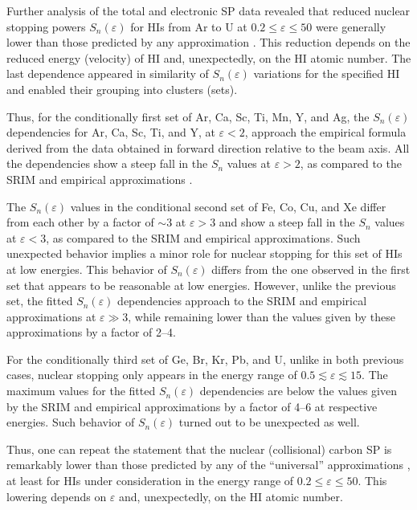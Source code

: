 \documentclass[aps,pra,twocolumn,amsmath,amssymb,floatfix]{revtex4-2}
\begin{document}
Further analysis of the total and electronic SP data revealed that reduced nuclear stopping powers $S_{n}(\varepsilon)$ for HIs from Ar to U at $0.2 \leqslant \varepsilon \leqslant 50$ were generally lower than those predicted by any approximation \cite{SRIM,Garnir80,LSS63,Ziegler77,Wilson77,LNS68}. This reduction depends on the reduced energy (velocity) of HI and, unexpectedly, on the HI atomic number. The last dependence appeared in similarity of $S_{n}(\varepsilon)$ variations for the specified HI and enabled their grouping into clusters (sets).

Thus, for the conditionally first set of Ar, Ca, Sc, Ti, Mn, Y, and Ag, the $S_{n}(\varepsilon)$ dependencies for Ar, Ca, Sc, Ti, and Y, at $\varepsilon < 2$, approach the empirical formula \cite{Garnir80} derived from the data obtained in forward direction relative to the beam axis. All the dependencies show a steep fall in the $S_{n}$ values at $\varepsilon > 2$, as compared to the SRIM and empirical approximations \cite{SRIM,Garnir80}.

The $S_{n}(\varepsilon)$ values in the conditional second set of Fe, Co, Cu, and Xe differ from each other  by a factor of $\sim$3 at $\varepsilon > 3$ and show a steep fall in the $S_{n}$ values at $\varepsilon < 3$, as compared to the SRIM and empirical approximations. Such unexpected behavior implies a minor role for nuclear stopping for this set of HIs at low energies. This behavior of $S_{n}(\varepsilon)$ differs from the one observed in the first set that appears to be reasonable at low energies. However, unlike the previous set, the fitted $S_{n}(\varepsilon)$ dependencies approach to the SRIM and empirical approximations at $\varepsilon \gg 3$, while remaining lower than the values given by these approximations by a factor of 2--4.

For the conditionally third set of Ge, Br, Kr, Pb, and U, unlike in both previous cases, nuclear stopping only appears in the energy range of $0.5 \lesssim \varepsilon \lesssim 15$. The maximum values for the fitted $S_{n}(\varepsilon)$ dependencies are below the values given by the SRIM and empirical approximations by a factor of 4--6 at respective energies. Such behavior of $S_{n}(\varepsilon)$ turned out to be unexpected as well.

Thus, one can repeat the statement that the nuclear (collisional) carbon SP is remarkably lower than those predicted by any of the ``universal'' approximations \cite{SRIM,Garnir80,LSS63,Ziegler77,Wilson77,LNS68}, at least for HIs under consideration in the energy range of $0.2 \leqslant \varepsilon \leqslant 50$. This lowering depends on  $\varepsilon$ and, unexpectedly, on the HI atomic number.
\end{document}
